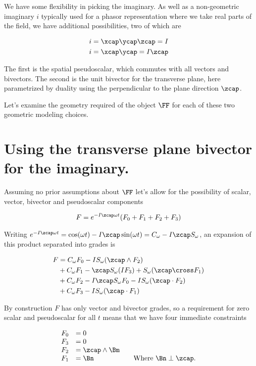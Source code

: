 We have some flexibility in picking the imaginary.  As well as a non-geometric imaginary $i$ typically used for a phasor representation where we take real parts of the field, we have additional possibilities, two of which are

\begin{align}\label{eqn:foo4}
i &= \xcap\ycap\zcap = I \\
i &= \xcap \ycap = I \zcap
\end{align}

The first is the spatial pseudoscalar, which commutes with all vectors and bivectors.  The second is the unit bivector for the transverse plane, here parametrized by duality using the perpendicular to the plane direction $\zcap$.

Let's examine the geometry required of the object $\FF$ for each of these two geometric modeling choices.

\section{Using the transverse plane bivector for the imaginary.}

Assuming no prior assumptions about $\FF$ let's allow for the possibility of scalar, vector, bivector and pseudoscalar components 

\begin{align}\label{eqn:foo5}
F = e^{-I\zcap \omega t} ( F_0 + F_1 + F_2 + F_3 )
\end{align}

Writing $e^{-I\zcap \omega t} = \cos(\omega t) -I \zcap \sin(\omega t) = C_\omega -I \zcap S_\omega$, an expansion of this product separated into grades is

\begin{align*}
F &= 
  C_\omega F_0 - I S_\omega (\zcap \wedge F_2) \\
&+ C_\omega F_1 - \zcap S_\omega (I F_3) + S_\omega (\zcap \cross F_1)  \\
&+ C_\omega F_2 - I \zcap S_\omega F_0 - I S_\omega (\zcap \cdot F_2) \\
&+ C_\omega F_3 - I S_\omega (\zcap \cdot F_1)
\end{align*}

By construction $F$ has only vector and bivector grades, so a requirement for zero scalar and pseudoscalar for all $t$ means that we have four immediate constraints

\begin{align*}
\begin{array}{l l l}
F_0 &= 0 & \\
F_3 &= 0 & \\
F_2 &= \zcap \wedge \Bm \\
F_1 &= \Bn & \quad \mbox{Where $\Bn \perp \zcap$.} \\
\end{array}
\end{align*}


